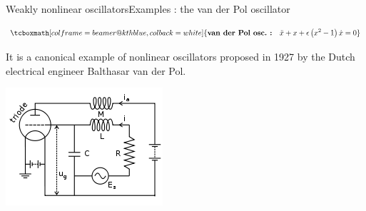 \documentclass[usenames,dvipsnames,svgnames,10pt,aspectratio=169]{beamer}
\begin{document}
\begin{frame}[t, c]{Weakly nonlinear oscillators}{Examples : the van der Pol oscillator}
  \begin{minipage}{.68\textwidth}
    \[
    \tcboxmath[colframe=beamer@kthblue, colback=white]{\textbf{van der Pol osc.\ :} \quad \ddot{x} + x + \epsilon \left( x^2 - 1 \right) \dot{x} = 0}
    \]

    \bigskip

    It is a canonical example of nonlinear oscillators proposed in 1927 by the Dutch electrical engineer Balthasar van der Pol.
  \end{minipage}%
  \hfill
  \begin{minipage}{.28\textwidth}
    \centering
    \includegraphics[width=\textwidth]{van_der_pol}
  \end{minipage}
\end{frame}
\end{document}
